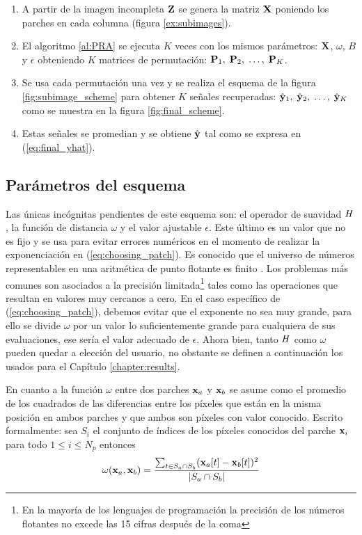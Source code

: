 \begin{enumerate}
	\item A partir de la imagen incompleta $\Z$ se genera la matriz $\X$ poniendo los parches en cada columna (figura \ref{ex:subimages}).
	\item El algoritmo \ref{al:PRA} se ejecuta $K$ veces con los mismos par\'ametros: $\X$, $\omega$, $B$ y $\epsilon$ obteniendo $K$ matrices de permutaci\'on: $\P_1,\; \P_2,\; \dots,\; \P_K$.
	\item Se usa cada permutaci\'on una vez y se realiza el esquema de la figura \ref{fig:subimage_scheme} para obtener $K$ señales recuperadas: $\yhat_1,\; \yhat_2,\; \dots,\; \yhat_K$ como se muestra en la figura \ref{fig:final_scheme}.
	\item Estas señales se promedian y se obtiene $\yhat$ tal como se expresa en (\ref{eq:final_yhat}).
\end{enumerate}

\subsection{Par\'ametros del esquema}
Las \'unicas incógnitas pendientes de este esquema son: el operador de suavidad $\H$, la funci\'on de distancia $\omega$ y el valor ajustable $\epsilon$. Este \'ultimo es un valor que no es fijo y se usa para evitar errores num\'ericos en el momento de realizar la exponenciaci\'on en (\ref{eq:choosing_patch}). Es conocido que el universo de números representables en una aritmética de punto flotante es finito \cite{conte2017elementary}. Los problemas m\'as comunes son asociados a la precisión limitada\footnote{En la mayoría de los lenguajes de programación la precisión de los n\'umeros flotantes no excede las 15 cifras despu\'es de la coma} tales como las operaciones que resultan en valores muy cercanos a cero. En el caso espec\'ifico de (\ref{eq:choosing_patch}), debemos evitar que el exponente no sea muy grande, para ello se divide $\omega$ por un valor lo suficientemente grande para cualquiera de sus evaluaciones, ese ser\'ia el valor adecuado de $\epsilon$. Ahora bien, tanto $\H$ como $\omega$ pueden quedar a elecci\'on del usuario, no obstante se definen a continuaci\'on los usados para el Cap\'itulo \ref{chapter:results}.

En cuanto a la funci\'on $\omega$ entre dos parches $\x_a$ y $\x_b$ se asume como el promedio de los cuadrados de las diferencias entre los p\'ixeles que est\'an en la misma posici\'on en ambos parches y que ambos son p\'ixeles con valor conocido. Escrito formalmente: sea $S_i$ el conjunto de \'indices de los p\'ixeles conocidos del parche $\x_i$ para todo $1 \le i \le N_p$ entonces
\begin{equation}
	\omega(\x_a, \x_b) = \frac{\sum_{t \in S_a \cap S_b} (\x_a[t] - \x_b[t])^2}{|S_a \cap S_b|}
	\label{eq:omega}
\end{equation}


